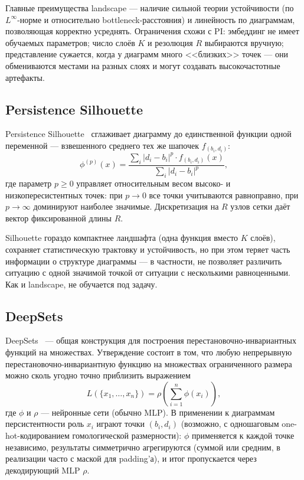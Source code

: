 Главные преимущества landscape --- наличие сильной теории устойчивости (по $L^\infty$-норме и относительно bottleneck-расстояния) и линейность по диаграммам, позволяющая корректно усреднять. Ограничения схожи с PI: эмбеддинг не имеет обучаемых параметров; число слоёв $K$ и резолюция $R$ выбираются вручную; представление сужается, когда у диаграмм много <<близких>> точек --- они обмениваются местами на разных слоях и могут создавать высокочастотные артефакты.

\subsection{Persistence Silhouette}
\label{ssec:ps}

Persistence Silhouette~\cite{chazalStochasticConvergencePersistence2014} сглаживает диаграмму до единственной функции одной переменной --- взвешенного среднего тех же шапочек $f_{(b_i, d_i)}$:
\[
\phi^{(p)}(x) = \frac{\sum_i |d_i - b_i|^p \cdot f_{(b_i, d_i)}(x)}{\sum_i |d_i - b_i|^p},
\]
где параметр $p \ge 0$ управляет относительным весом высоко- и низкопересистентных точек: при $p \to 0$ все точки учитываются равноправно, при $p \to \infty$ доминируют наиболее значимые. Дискретизация на $R$ узлов сетки даёт вектор фиксированной длины $R$.

Silhouette гораздо компактнее ландшафта (одна функция вместо $K$ слоёв), сохраняет статистическую трактовку и устойчивость, но при этом теряет часть информации о структуре диаграммы --- в частности, не позволяет различить ситуацию с одной значимой точкой от ситуации с несколькими равноценными. Как и landscape, не обучается под задачу.

\subsection{DeepSets}
\label{ssec:deepsets}

DeepSets~\cite{zaheerDeepSets2017} --- общая конструкция для построения перестановочно-инвариантных функций на множествах. Утверждение состоит в том, что любую непрерывную перестановочно-инвариантную функцию на множествах ограниченного размера можно сколь угодно точно приблизить выражением
\[
L(\{x_1, \dots, x_n\}) = \rho \!\left( \sum_{i=1}^{n} \phi(x_i) \right),
\]
где $\phi$ и $\rho$ --- нейронные сети (обычно MLP). В применении к диаграммам персистентности роль $x_i$ играют точки $(b_i, d_i)$ (возможно, с одношаговым one-hot-кодированием гомологической размерности): $\phi$ применяется к каждой точке независимо, результаты симметрично агрегируются (суммой или средним, в реализации часто с маской для padding'а), и итог пропускается через декодирующий MLP $\rho$.

